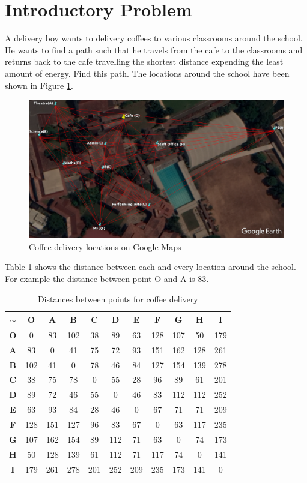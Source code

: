 \documentclass[a4paper]{article}
\begin{document}
\section{Introductory Problem}
A delivery boy wants to delivery coffees to various classrooms around the school. He wants to find a path such that he travels from the cafe to the classrooms and returns back to the cafe travelling the shortest distance expending the least amount of energy. Find this path. The locations around the school have been shown in  Figure \ref{fig:CoffeeMap}.
\begin{figure}[H]
        \centering
        \includegraphics[width=\textwidth]{images/CoffeeMap.png}
        \caption{Coffee delivery locations on Google Maps}
        \label{fig:CoffeeMap}
\end{figure}
Table \ref{tab:CoffeeCostMatrix} shows the distance between each and every location around the school. For example the distance between point O and A is 83.
\begin{table}[H]
        \centering
        \begin{tabular}{c|cccccccccc}
        $\sim$& \textbf{O}&\textbf{A}&\textbf{B}&\textbf{C}&\textbf{D}&\textbf{E}&\textbf{F}&\textbf{G}&\textbf{H}&\textbf{I} \\ \hline
        \textbf{O}&0  &83 &102&38 &89 &63 &128&107&50 &179\\
        \textbf{A}&83 &0  &41 &75 &72 &93 &151&162&128&261\\
        \textbf{B}&102&41 &0  &78 &46 &84 &127&154&139&278\\
        \textbf{C}&38 &75 &78 &0  &55 &28 &96 &89 &61 &201\\
        \textbf{D}&89 &72 &46 &55 &0  &46 &83 &112&112&252\\
        \textbf{E}&63 &93 &84 &28 &46 &0  &67 &71 &71 &209\\
        \textbf{F}&128&151&127&96 &83 &67 &0  &63 &117&235\\
        \textbf{G}&107&162&154&89 &112&71 &63 &0  &74 &173\\
        \textbf{H}&50 &128&139&61 &112&71 &117&74 &0  &141\\
        \textbf{I}&179&261&278&201&252&209&235&173&141&0  \\
        \end{tabular}
        \caption{Distances between points for coffee delivery}
        \label{tab:CoffeeCostMatrix}
    \end{table}
\end{document}

